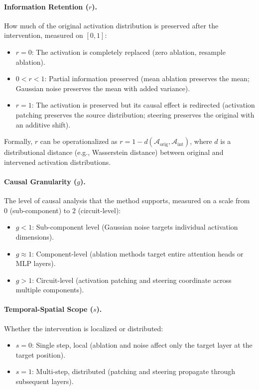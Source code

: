 \documentclass[pdflatex,sn-mathphys-num]{sn-jnl}
\begin{document}
\paragraph{Information Retention ($r$).} How much of the original activation distribution is preserved after the intervention, measured on $[0,1]$:
\begin{itemize}
    \item $r = 0$: The activation is completely replaced (zero ablation, resample ablation).
    \item $0 < r < 1$: Partial information preserved (mean ablation preserves the mean; Gaussian noise preserves the mean with added variance).
    \item $r = 1$: The activation is preserved but its causal effect is redirected (activation patching preserves the source distribution; steering preserves the original with an additive shift).
\end{itemize}
Formally, $r$ can be operationalized as $r = 1 - d(\mathcal{A}_{\text{orig}}, \mathcal{A}_{\text{int}})$, where $d$ is a distributional distance (e.g., Wasserstein distance) between original and intervened activation distributions.

\paragraph{Causal Granularity ($g$).} The level of causal analysis that the method supports, measured on a scale from $0$ (sub-component) to $2$ (circuit-level):
\begin{itemize}
    \item $g < 1$: Sub-component level (Gaussian noise targets individual activation dimensions).
    \item $g \approx 1$: Component-level (ablation methods target entire attention heads or MLP layers).
    \item $g > 1$: Circuit-level (activation patching and steering coordinate across multiple components).
\end{itemize}

\paragraph{Temporal-Spatial Scope ($s$).} Whether the intervention is localized or distributed:
\begin{itemize}
    \item $s = 0$: Single step, local (ablation and noise affect only the target layer at the target position).
    \item $s = 1$: Multi-step, distributed (patching and steering propagate through subsequent layers).
\end{itemize}
\end{document}
